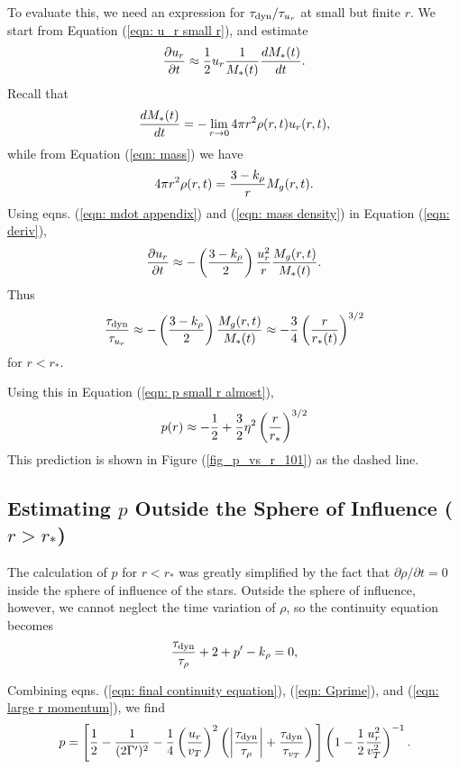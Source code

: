 \documentclass[iop,apj,numberedappendix]{emulateapj}
\newcommand       \be		{\begin{equation}}
\newcommand       \ee		{\end{equation}}
\newcommand       \etaeff       {\eta}
\newcommand       \tdyn         {\tau_{\rm dyn}}
\newcommand       \trho 	{{\tau_{\rho}}}
\newcommand       \tvr  	{{\tau_{u_r}}}
\newcommand       \tvt  	{{\tau_{v_T}}}
\begin{document}
To evaluate this, we need an expression for $\tdyn/\tvr$ at small but finite $r$. We start
from Equation (\ref{eqn: u_r small r}), and estimate
% 
\be  \label{eqn: deriv}%
{\partial u_r\over\partial t}\approx{1\over 2}u_r {1\over
  M_*(t)}{dM_*(t)\over dt}.
\ee  %
%
Recall that
% 
\be  \label{eqn: mdot appendix} %
{dM_*(t)\over dt}=-\lim_{r\to0}4\pi r^2\rho(r,t)u_r(r,t),
\ee  %
%
while from Equation (\ref{eqn: mass}) we have
% 
\be  \label{eqn: mass density} %
4\pi r^2\rho(r,t)=
{3-k_\rho\over r}M_g(r,t).
\ee  %
%
Using eqns. (\ref{eqn: mdot appendix}) and (\ref{eqn: mass density}) in Equation (\ref{eqn: deriv}),
% 
\be  %
{\partial u_r\over\partial t}\approx 
-\left({3-k_\rho\over 2}\right){u_r^2\over r}{M_g(r,t)\over M_*(t)}.
\ee  %
%
Thus
% 
\be  \label{eqn: tdyn over tvr}%
{\tdyn\over \tvr}\approx
 -\left({3-k_\rho\over 2}\right){M_g(r,t)\over M_*(t)}\approx
-{3\over 4}\left({r\over r_*(t)}\right)^{3/2}
\ee  %
%
for $r<r_*$.

Using this in Equation (\ref{eqn: p small r almost}),
%
\be \label{eqn: p small r} %
p(r)\approx -{1\over 2} +{3\over 2}\etaeff^2\left({r\over r_*}\right)^{3/2}
\ee  %
%
This prediction is shown in Figure (\ref{fig_p_vs_r_101}) as the dashed line.

\subsection{Estimating $p$ Outside the Sphere of Influence ($r>r_*$)}
The calculation of $p$ for $r<r_*$ was greatly simplified by the fact
that $\partial\rho/\partial t=0$ inside the sphere of influence of the
stars. Outside the sphere of influence, however, we cannot neglect the
time variation of $\rho$, so the continuity equation becomes
%
\be  \label{eqn: final continuity equation}%
{\tdyn\over\trho}+2+p'-k_\rho=0,
\ee  %
%

Combining eqns. (\ref{eqn: final continuity equation}), (\ref{eqn:
  Gprime}), and (\ref{eqn: large r momentum}), we find
% 
\be  \label{eqn: p for r big}%
p=\Bigg[
{1\over2}-{1\over (2\Gamma')^2}
-{1\over4}\left({u_r\over v_T}\right)^2
\left(
\left|{\tdyn\over\trho}\right|
+{\tdyn\over\tvt}
\right)
\Bigg ]
\left(1-{1\over2}{u_r^2\over v_T^2}\right)^{-1}.
\ee  %
%

\end{document}
